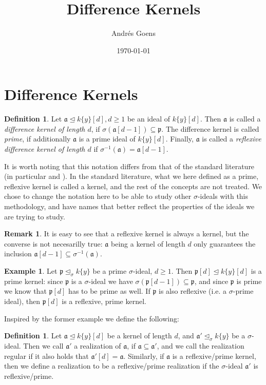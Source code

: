 \documentclass{article}
\title{Difference Kernels}
\author{Andr\'{e}s Goens}
\date{\today}
\def\a{\mathfrak{a}}
\def\p{\mathfrak{p}}
\def\s{\sigma}
\def\si{\unlhd_{\sigma}}
\theoremstyle{definition}
\newtheorem{theorem}[Satz]{Theorem}
\newtheorem{ex}[Satz]{Example}
\newtheorem{rem}[Satz]{Remark}
\newtheorem{defn}[Satz]{Definition}
\begin{document}
\section{Difference Kernels}



\begin{defn}
Let $\a \unlhd k\{y\}[d], d \geq 1$ be an ideal of $k\{y\}[d]$. Then $\a$ is called a \emph{difference kernel of length $d$}, if $\s(\a[d-1]) \subseteq \p$. The difference kernel is called \emph{prime}, if additionally $\a$ is a prime ideal of $k\{y\}[d]$.
Finally, $\a$ is called a \emph{reflexive difference kernel of length $d$} if $\s^{-1}(\a) = \a[d-1]$.
\end{defn}

It is worth noting that this notation differs from that of the standard literature (in particular \cite{cohn} and \cite{levin}). In the standard literature, what we here defined as a prime, reflexive kernel is called a kernel,
and the rest of the concepts are not treated. We chose to change the notation here to be able to study other $\s$-ideals with this methodology, and have names that better reflect the properties of the ideals we are trying to study.

\begin{rem}
It is easy to see that a reflexive kernel is always a kernel, but the converse is not necesarilly true: $\a$ being a kernel of length $d$ only guarantees the inclusion $\a[d-1] \subseteq \s^{-1}(\a)$.
\end{rem}

\begin{ex}
Let $\p \si k\{y\}$ be a prime $\s$-ideal, $d \geq 1$. Then $\p[d] \unlhd k\{y\}[d]$ is a prime kernel: since $\p$ is a $\s$-ideal we have $\s(\p[d-1]) \subseteq \p$, 
and since $\p$ is prime we know that $\p[d]$ has to be prime as well. If $\p$ is also reflexive (i.e. a $\s$-prime ideal), then $\p[d]$ is a reflexive, prime kernel. 
\end{ex}

Inspired by the former example we define the following:
\begin{defn}
Let $\a \unlhd k\{y\}[d]$ be a kernel of length $d$, and $\a' \si k\{y\}$ be a $\s$-ideal. Then we call $\a'$ a realization of $\a$, if $\a \subseteq \a'$, 
and we call the realization regular if it also holds that $\a'[d] = \a$. Similarly, if $\a$ is a reflexive/prime kernel, then we define a realization to be a reflexive/prime realization if the $\s$-ideal $\a'$ is reflexive/prime.
\end{defn}
\end{document}
